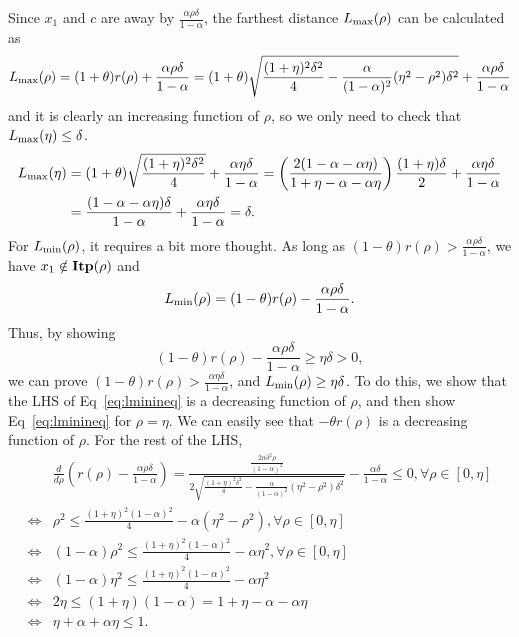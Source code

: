 Since $x_1$ and $c$ are away by $\frac{\alpha \rho \delta}{1-\alpha}$, the farthest distance $L_{\textup{max}}(\rho)$ can be calculated as
\begin{equation*}
	L_{\textup{max}}(\rho) 
	= (1+\theta)r(\rho) + \frac{\alpha \rho \delta}{1-\alpha}
	= (1+\theta)\sqrt{\frac{(1+\eta)^2\delta^2}{4}-\frac{\alpha}{(1-\alpha)^2}(\eta^2-\rho^2)\delta^2} 
	+ \frac{\alpha \rho \delta}{1-\alpha} 
\end{equation*}
and it is clearly an increasing function of $\rho$, so we only need to check that $L_{\textup{max}}(\eta) \leq \delta$.
\begin{align*}
	L_{\textup{max}}(\eta) 
	&= (1+\theta)\sqrt{\frac{(1+\eta)^2\delta^2}{4}} + \frac{\alpha \eta \delta}{1-\alpha} 
	= \left( \frac{2(1-\alpha-\alpha\eta)}{1+\eta-\alpha-\alpha\eta} \right)\frac{(1+\eta)\delta}{2} + \frac{\alpha \eta \delta}{1-\alpha}\\
	&= \frac{(1-\alpha-\alpha\eta)\delta}{1-\alpha}+\frac{\alpha \eta \delta}{1-\alpha} = \delta.
\end{align*}
For $L_{\textup{min}}(\rho)$, it requires a bit more thought. As long as
$(1-\theta) r(\rho) > \frac{\alpha \rho \delta}{1-\alpha}$, we have $x_1 \notin \mathbf{Itp}(\rho)$ and
\begin{equation*}
	L_{\textup{min}}(\rho)
	= (1-\theta) r(\rho)-\frac{\alpha \rho \delta}{1-\alpha}.
\end{equation*}
Thus, by showing
\begin{equation}
\label{eq:lminineq}
(1-\theta) r(\rho)-\frac{\alpha \rho \delta}{1-\alpha}\geq \eta\delta > 0, 
\end{equation}
we can prove $(1-\theta) r(\rho) > \frac{\alpha \eta \delta}{1-\alpha}$,
and $L_{\textup{min}}(\rho)\geq \eta\delta$.
To do this, we show that the LHS of Eq~\eqref{eq:lminineq} is a decreasing function of $\rho$,
and then show Eq~\eqref{eq:lminineq} for $\rho = \eta$.
We can easily see that $-\theta r(\rho)$ is a decreasing function of $\rho$.
For the rest of the LHS,
\begin{align*}
	&\frac{d}{d\rho} \left (r(\rho) - \frac{\alpha \rho \delta}{1-\alpha} \right )
	= \frac{\frac{2\alpha\delta^2\rho}{(1-\alpha)^2}}
	{2\sqrt{\frac{(1+\eta)^2\delta^2}{4}-\frac{\alpha}{(1-\alpha)^2}(\eta^2-\rho^2)\delta^2}}
	- \frac{\alpha\delta}{1-\alpha} \leq 0, 
	\forall \rho \in [0, \eta]\\
	\iff&
	\rho^2 \leq \frac{(1+\eta)^2(1-\alpha)^2}{4} - \alpha (\eta^2 - \rho^2), \forall \rho \in [0, \eta]\\
	\iff&
	(1-\alpha) \rho^2 \leq \frac{(1+\eta)^2(1-\alpha)^2}{4} - \alpha \eta^2, \forall \rho \in [0, \eta]\\
	\iff&
	(1-\alpha) \eta^2 \leq \frac{(1+\eta)^2(1-\alpha)^2}{4} - \alpha \eta^2\\
	\iff&
	2\eta \leq (1+\eta)(1-\alpha) = 1+\eta-\alpha-\alpha\eta\\
	\iff&
	\eta+\alpha+\alpha\eta \leq 1.
\end{align*}
